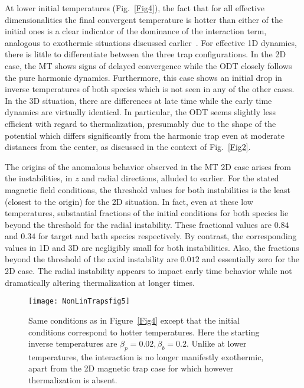 \documentclass[pra,letterpaper,onecolumn,superscriptaddress,floatfix]{revtex4}
\begin{document}
At lower initial temperatures (Fig.~\ref{Fig4}), the fact that for all effective dimensionalities the final convergent
temperature is hotter than either of the initial ones is a clear indicator of the dominance of the interaction 
term, analogous to exothermic situations discussed earlier~\cite{OnoSun,JauOnoSun}. 
For effective 1D dynamics, there is little to differentiate between the three trap configurations.
In the 2D case, the MT shows signs of delayed convergence while the ODT closely follows the pure harmonic dynamics.
Furthermore, this case shows an initial drop in inverse temperatures of both species which is not seen in any of
the other cases. In the 3D situation, there are differences at late time while the early time dynamics are virtually identical.
In particular, the ODT seems slightly less efficient with regard to thermalization, presumably due to the shape of the potential
which differs significantly from the harmonic trap even at moderate distances from the center, as discussed in the context
of Fig.~\ref{Fig2}. 
 
The origins of the anomalous behavior observed in the MT 2D case arises from the instabilities, in $z$ and radial 
directions, alluded to earlier. For the stated magnetic field conditions, the threshold values for both instabilities 
is the least (closest to the origin) for the 2D situation. In fact, even at these low temperatures, substantial 
fractions of the initial conditions for both species lie beyond the threshold for the radial instability. 
These fractional values are $0.84$ and $0.34$ for target and bath species respectively. By contrast, the 
corresponding values in 1D and 3D are negligibly small for both instabilities. Also, the fractions 
beyond the threshold of the axial instability are $0.012$ and essentially zero for the 2D case. 
The radial instability appears to impact early time behavior while not dramatically altering 
thermalization at longer times.

\begin{figure}[bt]
\texttt{[image: NonLinTrapsfig5]}
\caption{Same conditions as in Figure~\ref{Fig4} except that the initial conditions correspond to
hotter temperatures. Here the starting inverse temperatures are $\beta_p= 0.02, \beta_b=0.2$. Unlike
at lower temperatures, the interaction is no longer manifestly exothermic, apart from the 2D magnetic 
trap case for which however thermalization is absent.}
\label{Fig5}
\end{figure}
\end{document}
